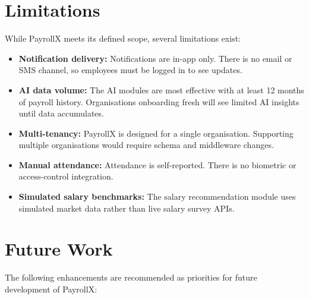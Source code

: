 \documentclass[12pt,a4paper]{report}
\begin{document}
\section{Limitations}

While PayrollX meets its defined scope, several limitations exist:

\begin{itemize}
    \item \textbf{Notification delivery:} Notifications are in-app only. There is no email or SMS channel, so employees must be logged in to see updates.
    \item \textbf{AI data volume:} The AI modules are most effective with at least 12 months of payroll history. Organisations onboarding fresh will see limited AI insights until data accumulates.
    \item \textbf{Multi-tenancy:} PayrollX is designed for a single organisation. Supporting multiple organisations would require schema and middleware changes.
    \item \textbf{Manual attendance:} Attendance is self-reported. There is no biometric or access-control integration.
    \item \textbf{Simulated salary benchmarks:} The salary recommendation module uses simulated market data rather than live salary survey APIs.
\end{itemize}

\section{Future Work}

The following enhancements are recommended as priorities for future development of PayrollX:
\end{document}

